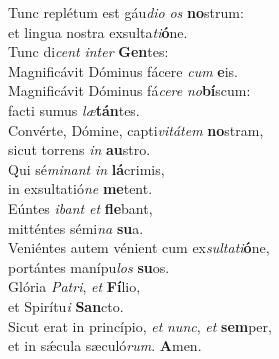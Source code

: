 \evenverse Tunc replétum est gáu\textit{di}\textit{o} \textit{os} \textbf{no}strum:~\*\\
\evenverse et lingua nostra exsulta\textit{ti}\textbf{ó}ne.\\
\oddverse Tunc di\textit{cent} \textit{in}\textit{ter} \textbf{Gen}tes:~\*\\
\oddverse Magnificávit Dóminus fácere \textit{cum} \textbf{e}is.\\
\evenverse Magnificávit Dóminus fá\textit{ce}\textit{re} \textit{no}\textbf{bí}scum:~\*\\
\evenverse facti sumus \textit{læ}\textbf{tán}tes.\\
\oddverse Convérte, Dómine, capti\textit{vi}\textit{tá}\textit{tem} \textbf{no}stram,~\*\\
\oddverse sicut torrens \textit{in} \textbf{au}stro.\\
\evenverse Qui sé\textit{mi}\textit{nant} \textit{in} \textbf{lá}crimis,~\*\\
\evenverse in exsultatió\textit{ne} \textbf{me}tent.\\
\oddverse Eúntes \textit{i}\textit{bant} \textit{et} \textbf{fle}bant,~\*\\
\oddverse mitténtes sémi\textit{na} \textbf{su}a.\\
\evenverse Veniéntes autem vénient cum ex\textit{sul}\textit{ta}\textit{ti}\textbf{ó}ne,~\*\\
\evenverse portántes manípu\textit{los} \textbf{su}os.\\
\oddverse Glória \textit{Pa}\textit{tri}, \textit{et} \textbf{Fí}lio,~\*\\
\oddverse et Spirítu\textit{i} \textbf{San}cto.\\
\evenverse Sicut erat in princípio, \textit{et} \textit{nunc}, \textit{et} \textbf{sem}per,~\*\\
\evenverse et in sǽcula sæculó\textit{rum}. \textbf{A}men.\\
